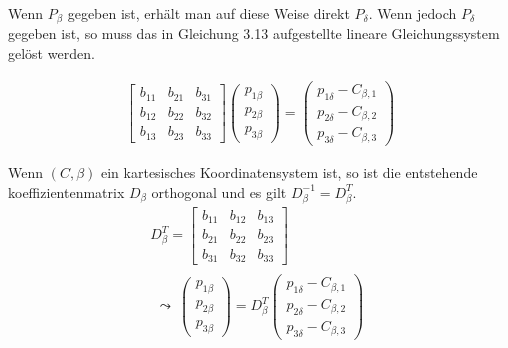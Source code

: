 Wenn $P_\beta$ gegeben ist, erhält man auf diese Weise direkt $P_\delta$. Wenn jedoch  $P_\delta$  gegeben ist, so muss das in Gleichung 3.13 aufgestellte lineare Gleichungssystem gelöst werden.
	
	\begin{gather}
	\begin{bmatrix}b_{11} & b_{21} & b_{31}\\
	b_{12} & b_{22} & b_{32}\\
	b_{13} & b_{23} & b_{33}
	\end{bmatrix} 
	\begin{pmatrix}
	p_{1\beta}\\p_{2\beta}\\ p_{3\beta}
	\end{pmatrix} = 
	\begin{pmatrix}
	p_{1\delta} - C_{\beta,1}\\
	p_{2\delta} - C_{\beta,2}\\
	p_{3\delta} - C_{\beta,3}
	\end{pmatrix}
	\end{gather}
	
 Wenn $(C,\beta)$ ein kartesisches Koordinatensystem ist, so ist die entstehende  koeffizientenmatrix $D_\beta$ orthogonal und es gilt \ensuremath{D_\beta^{-1} = D_\beta^T}. 
	\begin{gather}
	D_\beta^{T} = 
	\begin{bmatrix}b_{11} & b_{12} & b_{13}\\
	b_{21} & b_{22} & b_{23}\\
	b_{31} & b_{32} & b_{33}
	\end{bmatrix} \\
	\begin{split}
	\leadsto \: \begin{pmatrix}
	p_{1\beta}\\p_{2\beta}\\ p_{3\beta}
	\end{pmatrix}
	= D_\beta^T 
	\begin{pmatrix}
	p_{1\delta} - C_{\beta,1}\\
	p_{2\delta} - C_{\beta,2}\\
	p_{3\delta} - C_{\beta,3}
	\end{pmatrix}
	\end{split} 
	\end{gather}
	
